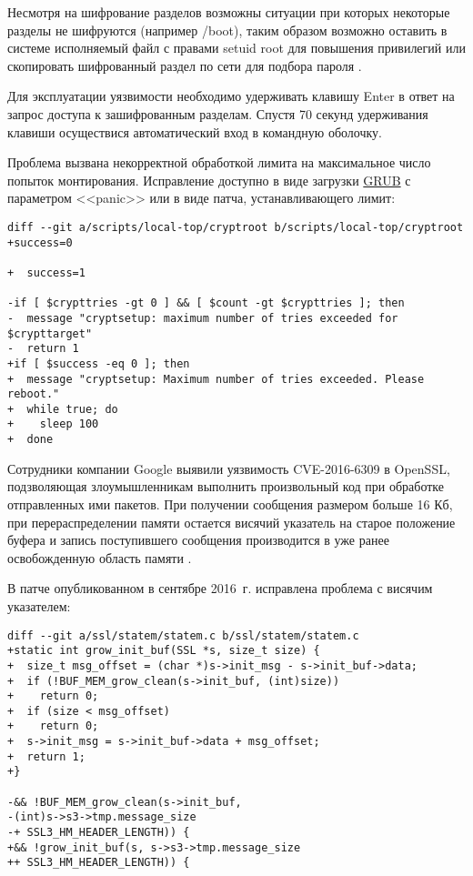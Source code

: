 Несмотря на шифрование разделов возможны ситуации при которых некоторые разделы не шифруются (например /boot), таким образом возможно оставить в системе исполняемый файл с правами setuid root для повышения привилегий или скопировать шифрованный раздел по сети для подбора пароля \cite{cryptsetup}.

Для эксплуатации уязвимости необходимо удерживать клавишу Enter в ответ на запрос доступа к зашифрованным разделам.
Спустя 70 секунд удерживания клавиши осуществися автоматический вход в командную оболочку.

Проблема вызвана некорректной обработкой лимита на максимальное число попыток монтирования.
Исправление доступно в виде загрузки \hyperlink{grub}{GRUB} с параметром <<panic>> или в виде патча, устанавливающего лимит:
\begin{lstlisting}
diff --git a/scripts/local-top/cryptroot b/scripts/local-top/cryptroot
+success=0

+  success=1

-if [ $crypttries -gt 0 ] && [ $count -gt $crypttries ]; then
-  message "cryptsetup: maximum number of tries exceeded for $crypttarget"
-  return 1
+if [ $success -eq 0 ]; then
+  message "cryptsetup: Maximum number of tries exceeded. Please reboot."
+  while true; do
+    sleep 100
+  done
\end{lstlisting}

Сотрудники компании Google выявили уязвимость CVE-2016-6309 в OpenSSL, подзволяющая злоумышленникам выполнить произвольный код при обработке отправленных ими пакетов.
При получении сообщения размером больше 16 Кб, при перераспределении памяти остается висячий указатель на старое положение буфера и запись поступившего сообщения производится в уже ранее освобожденную область памяти \cite{openssl}.

В патче опубликованном в сентябре 2016~г. исправлена проблема с висячим указателем:
\begin{lstlisting}
diff --git a/ssl/statem/statem.c b/ssl/statem/statem.c
+static int grow_init_buf(SSL *s, size_t size) {
+  size_t msg_offset = (char *)s->init_msg - s->init_buf->data;
+  if (!BUF_MEM_grow_clean(s->init_buf, (int)size))
+    return 0;
+  if (size < msg_offset)
+    return 0;
+  s->init_msg = s->init_buf->data + msg_offset;
+  return 1;
+}

-&& !BUF_MEM_grow_clean(s->init_buf,
-(int)s->s3->tmp.message_size
-+ SSL3_HM_HEADER_LENGTH)) {
+&& !grow_init_buf(s, s->s3->tmp.message_size
++ SSL3_HM_HEADER_LENGTH)) {
\end{lstlisting}

